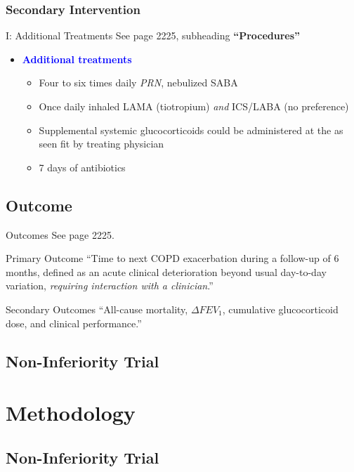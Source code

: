 \documentclass{beamer}
\newcommand{\pro}{\textcolor{blue}}
\begin{document}
		\subsubsection{Secondary Intervention}
			\begin{frame}{I: Additional Treatments}
				See page 2225, subheading \textbf{``Procedures''}
				\pause
				\begin{itemize}
					\item \pro{\textbf{Additional treatments}}
					\begin{itemize}
						\item Four to six times daily \textit{PRN}, nebulized SABA
						\item Once daily inhaled LAMA (tiotropium) \textit{and} ICS/LABA (no preference)
						\item Supplemental systemic glucocorticoids could be administered at the as seen fit by treating physician
						\item 7 days of antibiotics
					\end{itemize}
				\end{itemize}				
			\end{frame}
	\subsection{Outcome}
		\begin{frame}{Outcomes}
			See page 2225.
			\pause
			\begin{block}{Primary Outcome}
				``Time to next COPD exacerbation during a follow-up of 6 months, defined as an acute clinical deterioration beyond usual day-to-day variation, \textit{requiring interaction with a clinician}.''
			\end{block}
			\begin{alertblock}{Secondary Outcomes}
				``All-cause mortality, $\Delta FEV_1$, cumulative glucocorticoid dose, and clinical performance.''
			\end{alertblock}
		\end{frame}
		\subsection{Non-Inferiority Trial}
\section{Methodology}
	\subsection{Non-Inferiority Trial}
\end{document}
